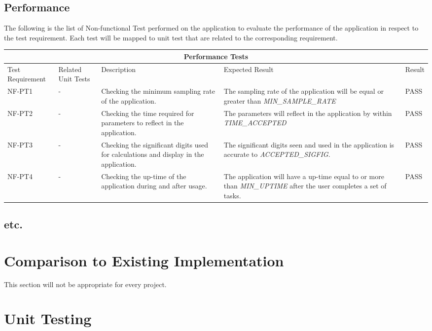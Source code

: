 \documentclass[12pt, titlepage]{article}
\begin{document}
\subsection{Performance}
The following is the list of Non-functional Test performed on the application to evaluate the performance of the application in respect to the test requirement. Each test will be mapped to unit test that are related to the corresponding requirement.\\
\begin{tabular}{ |p{2.3cm}||p{2cm}|p{3cm}|p{4cm}|p{2cm}| }
  \hline
  \multicolumn{5}{|c|}{Performance Tests} \\
  \hline
  Test Requirement & Related Unit Tests & Description & Expected Result & Result\\
  \hline
  NF-PT1   & - & Checking the minimum sampling rate of the application.  & The sampling rate of the application will be equal or greater than \textsl{MIN\_SAMPLE\_RATE} & PASS\\
  \hline
  NF-PT2   & - & Checking the time required for parameters to reflect in the application.  & The parameters will reflect in the application by within \textsl{TIME\_ACCEPTED} & PASS\\
  \hline
  NF-PT3   & - & Checking the significant digits used for calculations and display in the application.  &  The significant digits seen and used in the application is accurate to \textsl{ACCEPTED\_SIGFIG}. & PASS\\
  \hline
  NF-PT4   & - & Checking the up-time of the application during and after usage.  &  The application will have a up-time equal to or more than \textsl{MIN\_UPTIME} after the user completes a set of tasks. & PASS\\
  \hline
 \end{tabular}

\subsection{etc.}
	
\section{Comparison to Existing Implementation}	

This section will not be appropriate for every project.

\section{Unit Testing}
\end{document}

